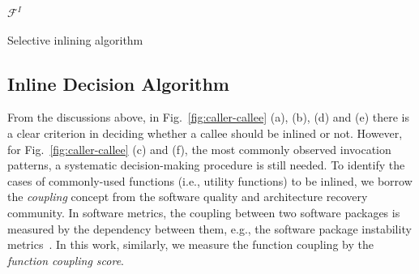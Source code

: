 \begin{MyAlgo}[t]{-4.9cm}
{{{  	%
  	}
}
\Return $\mathcal{F}^I$ \;
}
 \caption{Selective inlining algorithm}\label{algo:select-inline}
\end{MyAlgo}

\subsection{Inline Decision Algorithm}

From the discussions above, in Fig.~\ref{fig:caller-callee} (a), (b), (d) and (e) there is a clear criterion in deciding whether a callee
should be inlined or not.
However, for Fig.~\ref{fig:caller-callee} (c) and (f), the most commonly observed invocation patterns, a systematic decision-making procedure is still needed.
To identify the cases of commonly-used functions (i.e., utility functions) to be inlined, we borrow the \textit{coupling} concept from the software quality and architecture recovery community. In software metrics, the coupling between two software packages is measured by the dependency between them, e.g., the software package instability metrics~\cite{martin2003agile}. In this work, similarly, we measure the function coupling by the \textit{function coupling score}. %

